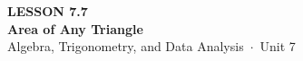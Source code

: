 \documentclass[aspectratio=169, 11pt]{beamer}
\begin{document}
{
\begin{frame}[plain]
  \vspace{2.8cm}\hspace{0.55cm}%
  \begin{minipage}{0.9\textwidth}
    {\color{goldacc}\bfseries\small LESSON 7.7}\\[0.5cm]
    {\color{white}\bfseries\LARGE Area of Any Triangle}\\[1.2cm]
    {\color{mistmid}\small Algebra, Trigonometry, and Data Analysis~$\cdot$~Unit 7}
  \end{minipage}
\end{frame}
}

\begin{frame}[t, plain]
\end{frame}
\end{document}
